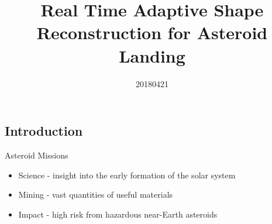 \documentclass[11pt,professionalfonts,aspectratio=169]{beamer}
\title[Asteroid Reconstruction]{\large\textbf Real Time Adaptive Shape Reconstruction for Asteroid Landing}
\author{\vspace*{-0.3cm}}
\institute{
	\footnotesize
	{\normalsize\bf{Shankar Kulumani}}\\
	\vspace*{0.2cm}
  	\textbf{Department of Mechanical \& Aerospace Engineering}\\ \vspace*{0.5cm}
 	\begin{figure} %
       	\texttt{[image: gw\_txh\_2cs\_pos]}
  	\end{figure}
}
\date{20180421}
\begin{document}

\setcounter{framenumber}{-1}
\begin{frame} %
  \titlepage
\end{frame}   %

\section*{}
\subsection*{Introduction}  
\begin{frame}{Asteroid Missions}
\begin{itemize}
    \item<1-> Science - insight into the early formation of the solar system
    \item<2-> Mining - vast quantities of useful materials
    \item<3-> Impact - high risk from hazardous near-Earth asteroids
\end{itemize}    

\end{frame}
\end{document}
